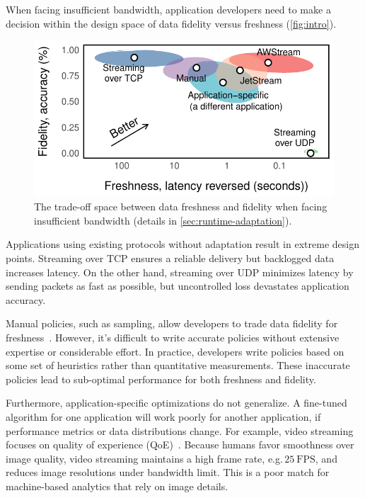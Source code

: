 When facing insufficient bandwidth, application developers need to make a
decision within the design space of data fidelity versus freshness
(\autoref{fig:intro}).

\begin{figure}
  \centering
  \includegraphics[width=0.9\columnwidth]{figures/figure1a.pdf}
  \caption{The trade-off space between data freshness and fidelity when facing
    insufficient bandwidth (details in \autoref{sec:runtime-adaptation}).}
  \label{fig:intro}
  \vspace{-1em}
\end{figure}

Applications using existing protocols without adaptation result in extreme
design points. Streaming over TCP ensures a reliable delivery but backlogged
data increases latency. On the other hand, streaming over UDP minimizes latency
by sending packets as fast as possible, but uncontrolled loss devastates
application accuracy.

Manual policies, such as sampling, allow developers to trade data fidelity for
freshness~\cite{rabkin2014aggregation}.  However, it's difficult to write
accurate policies without extensive expertise or considerable effort.  In
practice, developers write policies based on some set of heuristics rather than
quantitative measurements. These inaccurate policies lead to sub-optimal
performance for both freshness and fidelity.

Furthermore, application-specific optimizations do not generalize. A fine-tuned
algorithm for one application will work poorly for another application, if
performance metrics or data distributions change.  For example, video streaming
focuses on quality of experience (QoE)~\cite{yin2015control}.  Because humans
favor smoothness over image quality, video streaming maintains a high frame
rate, e.g.\,\(25~\text{FPS}\), and reduces image resolutions under bandwidth
limit.  This is a poor match for machine-based analytics that rely on image
details.

